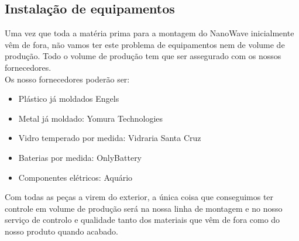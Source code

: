\documentclass[a4paper]{article}
\begin{document}
\subsection{Instalação de equipamentos}
Uma vez que toda a matéria prima para a montagem do NanoWave inicialmente vêm de fora, não vamos ter este problema de equipamentos nem de volume de produção. Todo o volume de produção tem que ser assegurado com os nossos fornecedores.\\
Os nosso fornecedores poderão ser: 
\begin{itemize}
    \item Plástico já moldados Engels
    \item Metal já moldado: Yomura Technologies
    \item Vidro temperado por medida: Vidraria Santa Cruz
    \item Baterias por medida: OnlyBattery
    \item Componentes elétricos: Aquário
\end{itemize}
Com todas as peças a virem do exterior, a única coisa que conseguimos ter controle  em volume de produção será na nossa linha de montagem e no nosso serviço de controlo e qualidade tanto dos materiais que vêm de fora como do nosso produto quando acabado.
\end{document}
